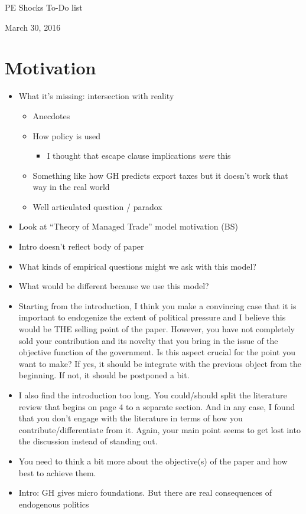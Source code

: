 \documentclass[12pt]{article}
\begin{document}
\begin{center}
PE Shocks To-Do list
\end{center}

March 30, 2016

\section{Motivation}
		\begin{itemize}
			\item What it's missing: intersection with reality
				\begin{itemize}
					\item Anecdotes
					\item How policy is used
						\begin{itemize}
							\item I thought that escape clause implications \textit{were} this
						\end{itemize}
					\item Something like how GH predicts export taxes but it doesn't work that way in the real world
					\item Well articulated question / paradox
				\end{itemize}
			\item Look at ``Theory of Managed Trade'' model motivation (BS)
			\item Intro doesn't reflect body of paper
			\item What kinds of empirical questions might we ask with this model?
			\item What would be different because we use this model?
			\item Starting from the introduction, I think you make a convincing case that it is important to endogenize the extent of political pressure and I believe this would be THE selling point of the paper. However, you have not completely sold your contribution and its novelty that you bring in the issue of the objective function of the government. Is this aspect crucial for the point you want to make? If yes, it should be integrate with the previous object from the beginning. If not, it should be postponed a bit.
			\item I also find the introduction too long. You could/should split the literature review that begins on page 4 to a separate section. And in any case, I found that you don't engage with the literature in terms of how you contribute/differentiate from it. Again, your main point seems to get lost into the discussion instead of standing out.
			\item You need to think a bit more about the objective(s) of the paper and how best to achieve them.
			\item Intro: GH gives micro foundations. But there are real consequences of endogenous politics
		\end{itemize}
		
\end{document}

